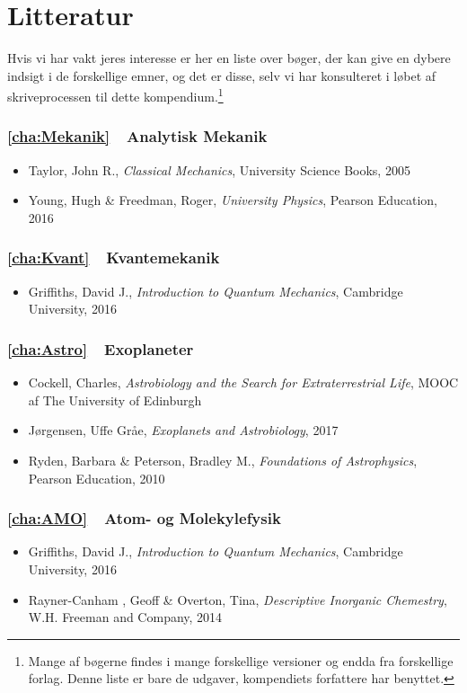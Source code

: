 \chapter{Litteratur}
Hvis vi har vakt jeres interesse er her en liste over bøger, der kan give en dybere indsigt i de forskellige emner, og det er disse, selv vi har konsulteret i løbet af skriveprocessen til dette kompendium.\footnote{Mange af bøgerne findes i mange forskellige versioner og endda fra forskellige forlag. Denne liste er bare de udgaver, kompendiets forfattere har benyttet.}
\subsection*{\ref{cha:Mekanik}~~Analytisk Mekanik}
\begin{itemize}
\item Taylor, John R., \textit{Classical Mechanics}, University Science Books, 2005
\item Young, Hugh \& Freedman, Roger, \textit{University Physics}, Pearson Education, 2016
\end{itemize}
\subsection*{\ref{cha:Kvant}~~Kvantemekanik}
\begin{itemize}
\item Griffiths, David J., \textit{Introduction to Quantum Mechanics}, Cambridge University, 2016
\end{itemize}
\subsection*{\ref{cha:Astro}~~Exoplaneter}
\begin{itemize}
\item Cockell, Charles, \textit{Astrobiology and the Search for Extraterrestrial Life}, MOOC af The University of Edinburgh
\item Jørgensen, Uffe Gråe, \textit{Exoplanets and Astrobiology}, 2017
\item Ryden, Barbara \& Peterson, Bradley M., \textit{Foundations of Astrophysics}, Pearson Education, 2010
\end{itemize}
\subsection*{\ref{cha:AMO}~~Atom- og Molekylefysik}
\begin{itemize}
\item Griffiths, David J., \textit{Introduction to Quantum Mechanics}, Cambridge University, 2016
\item Rayner-Canham , Geoff \& Overton, Tina, \textit{Descriptive Inorganic Chemestry}, W.H. Freeman and Company, 2014
\end{itemize}
